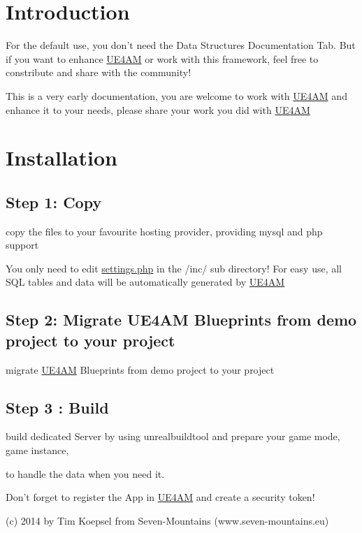 \hypertarget{index_intro_sec}{}\section{Introduction}\label{index_intro_sec}
For the default use, you don't need the Data Structures Documentation Tab. But if you want to enhance \hyperlink{class_u_e4_a_m}{U\-E4\-A\-M} or work with this framework, feel free to constribute and share with the community!

This is a very early documentation, you are welcome to work with \hyperlink{class_u_e4_a_m}{U\-E4\-A\-M} and enhance it to your needs, please share your work you did with \hyperlink{class_u_e4_a_m}{U\-E4\-A\-M}\hypertarget{index_install_sec}{}\section{Installation}\label{index_install_sec}
\hypertarget{index_step1}{}\subsection{Step 1\-: Copy}\label{index_step1}
copy the files to your favourite hosting provider, providing mysql and php support

You only need to edit \hyperlink{settings_8php}{settings.\-php} in the /inc/ sub directory! For easy use, all S\-Q\-L tables and data will be automatically generated by \hyperlink{class_u_e4_a_m}{U\-E4\-A\-M}\hypertarget{index_step2}{}\subsection{Step 2\-: Migrate U\-E4\-A\-M Blueprints from demo project to your project}\label{index_step2}
migrate \hyperlink{class_u_e4_a_m}{U\-E4\-A\-M} Blueprints from demo project to your project \hypertarget{index_step3}{}\subsection{Step 3 \-: Build}\label{index_step3}
build dedicated Server by using unrealbuildtool and prepare your game mode, game instance,

to handle the data when you need it.

Don't forget to register the App in \hyperlink{class_u_e4_a_m}{U\-E4\-A\-M} and create a security token!

(c) 2014 by Tim Koepsel from Seven-\/\-Mountains (www.\-seven-\/mountains.\-eu) 